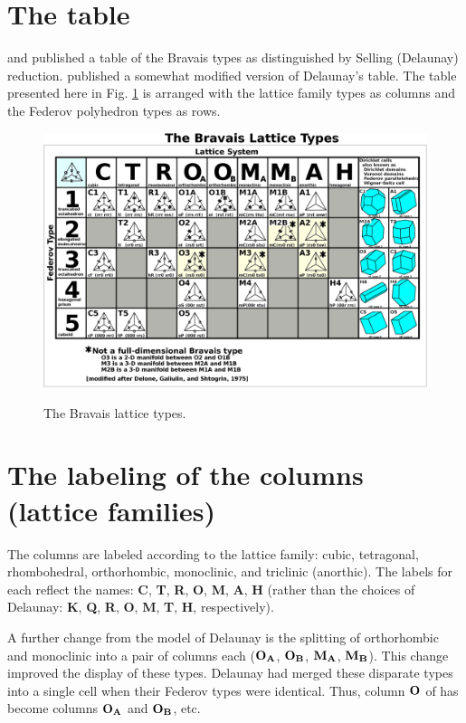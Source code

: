 \documentclass[preprint]{iucr}              %
\numberwithin{equation}{section}
\begin{document}
		
	
\section{The table}

	 and  published a table of the Bravais types
	as distinguished by Selling (Delaunay) reduction.\cite{andrews2023measuring} published
	a somewhat modified version of Delaunay's table. The table presented here in Fig. \ref{grid}
	is arranged with the lattice family types as columns and the Federov polyhedron
	types \cite{fedorov1891symmetry} \cite{fedorov1885elements} as rows.
		\begin{figure}
		\includegraphics[width=15cm]{HorizontalDeloneGrid.eps}
		\label{grid}
		\caption{The  Bravais lattice types.}
	    \end{figure}
	
\section{The labeling of the columns (lattice families)}
	
	The columns are labeled according to the lattice family: cubic,
	tetragonal, rhombohedral, orthorhombic, monoclinic, and
	triclinic (anorthic). The labels for each reflect the names:
	\textbf{C}, \textbf{T}, \textbf{R}, \textbf{O},\textbf{ M}, \textbf{A}, \textbf{H} (rather than the choices of Delaunay: 
        \textbf{K}, \textbf{Q},	\textbf{R},\textbf{ O},\textbf{ M}, \textbf{T}, \textbf{H}, respectively).
	
	A further change from the model of Delaunay is the splitting 
	of orthorhombic and monoclinic into a pair of columns each
	($\bf{O_A}$, $\bf{O_B}$, $\bf{M_A}$, $\bf{M_B}$). This change 
	improved the display of these types. Delaunay had merged these
	disparate types into a single cell when their Federov
	types were identical. Thus, column $\bf{O}$ of 
	has become columns $\bf{O_A}$ and $\bf{O_B}$, etc.
		
\end{document}

